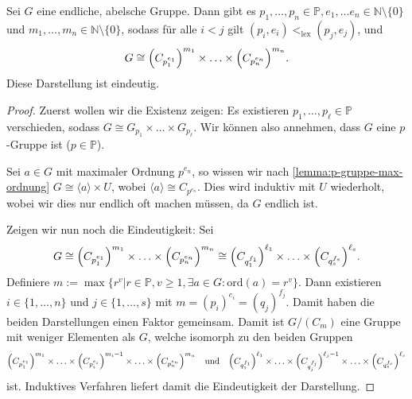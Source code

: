 \begin{theorem}
    Sei $G$ eine endliche, abelsche Gruppe. Dann gibt es $p_1, \hdots, p_n \in \mathbb{P}, e_1, \hdots e_n \in \mathbb{N} \setminus \{0\}$ und $m_1, \hdots, m_n \in \mathbb{N} \setminus \{0\}$, sodass für alle $i < j$ gilt $(p_i, e_i) <_{\text{lex}} (p_j, e_j)$, und
    $$ G \cong \Bigl( C_{p_1^{e_1}} \Bigr)^{m_1} \times \hdots \times \Bigl( C_{p_n^{e_n}} \Bigr)^{m_n}. $$
    Diese Darstellung ist eindeutig.
\end{theorem}

\begin{proof} 
    Zuerst wollen wir die Existenz zeigen: Es existieren $p_1, \hdots, p_\ell \in \mathbb{P}$ verschieden, sodass $G \cong G_{p_1} \times \hdots \times G_{p_\ell}$. Wir können also \obda annehmen, dass $G$ eine $p$-Gruppe ist ($p \in \mathbb{P}$).

    Sei $a \in G$ mit maximaler Ordnung $p^{e_n}$, so wissen wir nach \cref{lemma:p-gruppe-max-ordnung} $G \cong \langle a \rangle \times U$, wobei $\langle a \rangle \cong C_{p^{e_n}}$. Dies wird induktiv mit $U$ wiederholt, wobei wir dies nur endlich oft machen müssen, da $G$ endlich ist.

    Zeigen wir nun noch die Eindeutigkeit: Sei $$G \cong \Bigl( C_{p_1^{e_1}} \Bigr)^{m_1} \times \hdots \times \Bigl( C_{p_n^{e_n}} \Bigr)^{m_n} \cong \Bigl( C_{q_1^{f_1}} \Bigr)^{\ell_1} \times \hdots \times \Bigl( C_{q_s^{f_s}} \Bigr)^{\ell_s} .$$
    Definiere $m:=\max\{r^v| r\in\mathbb{P}, v\geq1, \exists a\in G:\mathrm{ord}(a)=r^v\}$. Dann existieren $i\in\{1,\ldots,n\}$
    und $j\in\{1,\ldots,s\}$ mit $m=(p_i)^{e_i}=(q_j)^{f_j}$. Damit haben die beiden Darstellungen einen Faktor gemeinsam. Damit ist
    $G/(C_{m})$ eine Gruppe mit weniger Elementen als $G$, welche isomorph zu den beiden Gruppen
    $$\Bigl( C_{p_1^{e_1}} \Bigr)^{m_1} \times \hdots \times \Bigl( C_{p_i^{e_i}} \Bigr)^{m_i-1} \times \hdots \times \Bigl( C_{p_n^{e_n}} \Bigr)^{m_n} \quad\text{und}\quad \Bigl( C_{q_1^{f_1}} \Bigr)^{\ell_1} \times \hdots \times\Bigl( C_{q_j^{f_j}} \Bigr)^{\ell_j-1} \times \hdots\times \Bigl( C_{q_s^{f_s}} \Bigr)^{\ell_s}$$
    ist. Induktives Verfahren liefert damit die Eindeutigkeit der Darstellung.
\end{proof}

